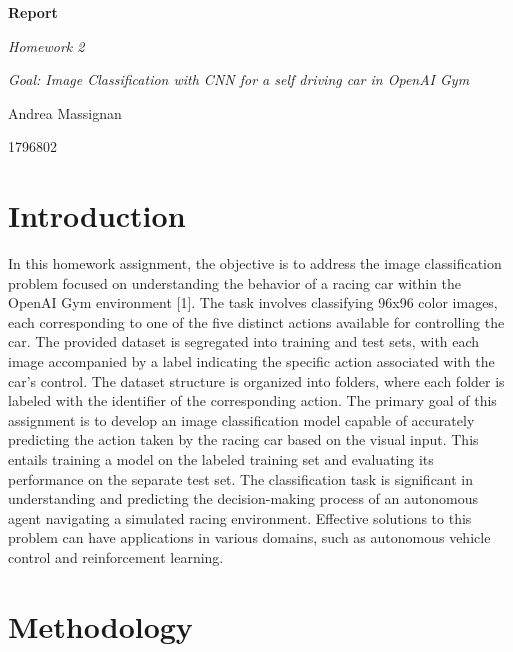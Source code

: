 \documentclass{article}
\begin{document}
\begin{titlepage}
    \centering
    \vspace*{2cm}
    {\Huge\bfseries Report\par}
    \vspace{2cm}
    {\Large\itshape Homework 2\par}
    \vspace{0.5cm}
    {\large\itshape Goal: Image Classification with CNN for a self driving car in OpenAI Gym\par}
    \vfill
    {\Large Andrea Massignan\par}
    {\Large 1796802\par}
    \vfill
\end{titlepage}

\section{Introduction}

In this homework assignment, the objective is to address the image classification problem focused on understanding the behavior of a racing car within the OpenAI Gym environment [1]. The task involves classifying 96x96 color images, each corresponding to one of the five distinct actions available for controlling the car.
\newline
\newline
The provided dataset is segregated into training and test sets, with each image accompanied by a label indicating the specific action associated with the car's control. The dataset structure is organized into folders, where each folder is labeled with the identifier of the corresponding action.
\newline
\newline
The primary goal of this assignment is to develop an image classification model capable of accurately predicting the action taken by the racing car based on the visual input. This entails training a model on the labeled training set and evaluating its performance on the separate test set.
\newline
\newline
The classification task is significant in understanding and predicting the decision-making process of an autonomous agent navigating a simulated racing environment. Effective solutions to this problem can have applications in various domains, such as autonomous vehicle control and reinforcement learning.

\section{Methodology}
\end{document}
